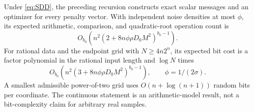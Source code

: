 \begin{theorem}\label{thm:block}
Under \eqref{eq:SDD}, the preceding recursion constructs exact scalar
messages and an optimizer for every penalty vector. With independent noise
densities at most $\phi$, its expected arithmetic, comparison, and
quadratic-root operation count is
\begin{equation}\label{eq:blockcontinuous}
 O_{b_0}\!\left(n^2(2+8n\phi\rho D_0M^2)^{b_0-1}\right).
\end{equation}
For rational data and the endpoint grid with $N\ge4n2^n$, its expected
bit cost is a factor polynomial in the rational input length and $\log N$ times
\begin{equation}\label{eq:blockgrid}
 O_{b_0}\!\left(n^2(3+8n\phi\rho D_0M^2)^{b_0-1}\right),
 \qquad \phi=1/(2\sigma).
\end{equation}
A smallest admissible power-of-two grid uses $O(n+\log(n+1))$ random bits
per coordinate. The continuous statement is an arithmetic-model result,
not a bit-complexity claim for arbitrary real samples.
\end{theorem}
